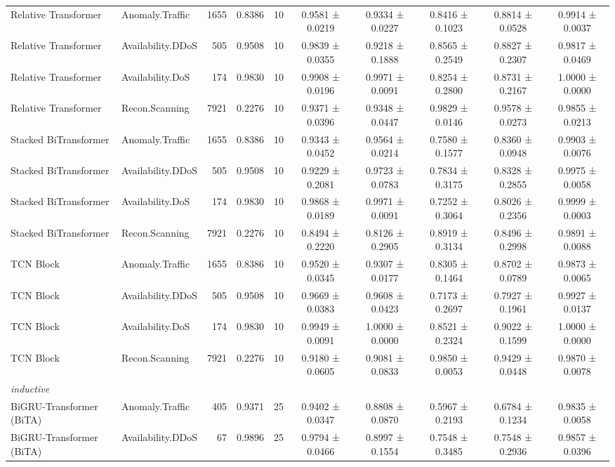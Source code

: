 \begin{tabular}{llrrrccccc}
Relative Transformer & Anomaly.Traffic & 1655 & 0.8386 & 10 & 0.9581 ± 0.0219 & 0.9334 ± 0.0227 & 0.8416 ± 0.1023 & 0.8814 ± 0.0528 & 0.9914 ± 0.0037 \\
Relative Transformer & Availability.DDoS & 505 & 0.9508 & 10 & 0.9839 ± 0.0355 & 0.9218 ± 0.1888 & 0.8565 ± 0.2549 & 0.8827 ± 0.2307 & 0.9817 ± 0.0469 \\
Relative Transformer & Availability.DoS & 174 & 0.9830 & 10 & 0.9908 ± 0.0196 & 0.9971 ± 0.0091 & 0.8254 ± 0.2800 & 0.8731 ± 0.2167 & 1.0000 ± 0.0000 \\
Relative Transformer & Recon.Scanning & 7921 & 0.2276 & 10 & 0.9371 ± 0.0396 & 0.9348 ± 0.0447 & 0.9829 ± 0.0146 & 0.9578 ± 0.0273 & 0.9855 ± 0.0213 \\
Stacked BiTransformer & Anomaly.Traffic & 1655 & 0.8386 & 10 & 0.9343 ± 0.0452 & 0.9564 ± 0.0214 & 0.7580 ± 0.1577 & 0.8360 ± 0.0948 & 0.9903 ± 0.0076 \\
Stacked BiTransformer & Availability.DDoS & 505 & 0.9508 & 10 & 0.9229 ± 0.2081 & 0.9723 ± 0.0783 & 0.7834 ± 0.3175 & 0.8328 ± 0.2855 & 0.9975 ± 0.0058 \\
Stacked BiTransformer & Availability.DoS & 174 & 0.9830 & 10 & 0.9868 ± 0.0189 & 0.9971 ± 0.0091 & 0.7252 ± 0.3064 & 0.8026 ± 0.2356 & 0.9999 ± 0.0003 \\
Stacked BiTransformer & Recon.Scanning & 7921 & 0.2276 & 10 & 0.8494 ± 0.2220 & 0.8126 ± 0.2905 & 0.8919 ± 0.3134 & 0.8496 ± 0.2998 & 0.9891 ± 0.0088 \\
TCN Block & Anomaly.Traffic & 1655 & 0.8386 & 10 & 0.9520 ± 0.0345 & 0.9307 ± 0.0177 & 0.8305 ± 0.1464 & 0.8702 ± 0.0789 & 0.9873 ± 0.0065 \\
TCN Block & Availability.DDoS & 505 & 0.9508 & 10 & 0.9669 ± 0.0383 & 0.9608 ± 0.0423 & 0.7173 ± 0.2697 & 0.7927 ± 0.1961 & 0.9927 ± 0.0137 \\
TCN Block & Availability.DoS & 174 & 0.9830 & 10 & 0.9949 ± 0.0091 & 1.0000 ± 0.0000 & 0.8521 ± 0.2324 & 0.9022 ± 0.1599 & 1.0000 ± 0.0000 \\
TCN Block & Recon.Scanning & 7921 & 0.2276 & 10 & 0.9180 ± 0.0605 & 0.9081 ± 0.0833 & 0.9850 ± 0.0053 & 0.9429 ± 0.0448 & 0.9870 ± 0.0078 \\
\midrule
\multicolumn{10}{l}{\textit{inductive}} \\
\midrule
BiGRU-Transformer (BiTA) & Anomaly.Traffic & 405 & 0.9371 & 25 & 0.9402 ± 0.0347 & 0.8808 ± 0.0870 & 0.5967 ± 0.2193 & 0.6784 ± 0.1234 & 0.9835 ± 0.0058 \\
BiGRU-Transformer (BiTA) & Availability.DDoS & 67 & 0.9896 & 25 & 0.9794 ± 0.0466 & 0.8997 ± 0.1554 & 0.7548 ± 0.3485 & 0.7548 ± 0.2936 & 0.9857 ± 0.0396 \\

\end{tabular}
